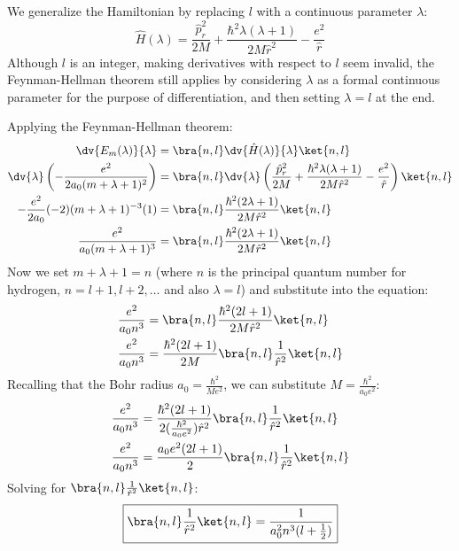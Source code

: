 \begin{solution}
    We generalize the Hamiltonian by replacing $l$ with a continuous
    parameter $\lambda$:
    \begin{equation} \label{eq:hydrogen_H_lambda}
        \hat H(\lambda) = \frac{\hat p_r^2}{2M} + \frac{\hbar^2
        \lambda(\lambda+1)}{2M\hat r^2} - \frac{e^2}{\hat r}
    \end{equation}
    Although $l$ is an integer, making derivatives with respect to
    $l$ seem invalid, the Feynman-Hellman theorem still applies by
    considering $\lambda$ as a formal continuous parameter for the
    purpose of differentiation, and then setting $\lambda=l$ at the end.

    Applying the Feynman-Hellman theorem:
    \begin{align} \label{eq:hydrogen_feynman_hellman_derivation}
        \dv{E_m(\lambda)}{\lambda} &= \bra{n,l}\dv{\hat
        H(\lambda)}{\lambda}\ket{n,l} \\
        \dv{\lambda}\left(-\frac{e^2}{2a_0(m+\lambda+1)^2}\right) &=
        \bra{n,l} \dv{\lambda}\left(\frac{\hat p_r^2}{2M} +
            \frac{\hbar^2 \lambda(\lambda+1)}{2M\hat r^2} -
        \frac{e^2}{\hat r}\right) \ket{n,l} \notag \\
        -\frac{e^2}{2a_0}(-2)(m+\lambda+1)^{-3}(1) &= \bra{n,l}
        \frac{\hbar^2(2\lambda + 1)}{2M \hat r^2} \ket{n,l} \notag \\
        \frac{e^2}{a_0(m+\lambda+1)^3} &= \bra{n,l}
        \frac{\hbar^2(2\lambda + 1)}{2M \hat r^2} \ket{n,l} \notag
    \end{align}
    Now we set $m+\lambda+1 = n$ (where $n$ is the principal quantum
        number for hydrogen, $n = l+1, l+2, \dots$ and also $\lambda =
    l$) and substitute into the equation:
    \begin{align}
        \frac{e^2}{a_0 n^3} &= \bra{n,l} \frac{\hbar^2(2l + 1)}{2M
        \hat r^2} \ket{n,l} \\
        \frac{e^2}{a_0 n^3} &= \frac{\hbar^2(2l + 1)}{2M} \bra{n,l}
        \frac{1}{\hat r^2} \ket{n,l} \notag
    \end{align}
    Recalling that the Bohr radius $a_0 = \frac{\hbar^2}{Me^2}$, we
    can substitute $M = \frac{\hbar^2}{a_0 e^2}$:
    \begin{align}
        \frac{e^2}{a_0 n^3} &= \frac{\hbar^2(2l +
        1)}{2(\frac{\hbar^2}{a_0 e^2}) \hat r^2} \bra{n,l}
        \frac{1}{\hat r^2} \ket{n,l} \notag \\
        \frac{e^2}{a_0 n^3} &= \frac{a_0 e^2 (2l + 1)}{2} \bra{n,l}
        \frac{1}{\hat r^2} \ket{n,l} \notag
    \end{align}
    Solving for $\bra{n,l} \frac{1}{\hat r^2} \ket{n,l}$:
    \begin{equation} \label{eq:r_minus_2_expectation_value}
        \boxed{\bra{n,l} \frac{1}{\hat r^2} \ket{n,l} =
        \frac{1}{a_0^2 n^3(l + \frac{1}{2})}}
    \end{equation}
\end{solution}

